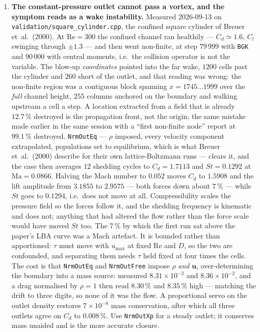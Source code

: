 \documentclass[11pt,a4paper]{article}
\newcommand{\code}[1]{\texttt{\small #1}}
\begin{document}
\begin{enumerate}[leftmargin=1.4em,itemsep=4pt]
\item \textbf{The constant-pressure outlet cannot pass a vortex, and the
  symptom reads as a wake instability.} Measured 2026-09-13 on
  \code{validation/square\_cylinder.cpp}, the confined square cylinder of
  Breuer et~al.\ (2000). At $\mathrm{Re}=300$ the confined channel
  ran healthily --- $C_d\simeq1.6$, $C_l$ swinging through $\pm1.3$ --- and then
  went non-finite, at step $79\,999$ with \code{BGK} and $90\,000$ with central
  moments, i.e.\ the collision operator is not the variable. The blow-up
  \emph{coordinates} pointed into the far wake, $1200$ cells past the cylinder
  and $260$ short of the outlet, and that reading was wrong: the non-finite
  region was a contiguous block spanning $x=1745\ldots1999$ over the \emph{full}
  channel height, $255$ columns anchored on the boundary and walking upstream a
  cell a step. A location extracted from a field that is already $12.7\,\%$
  destroyed is the propagation front, not the origin; the same mistake made
  earlier in the same session with a ``first non-finite node'' report at
  $99.1\,\%$ destroyed. \code{NrmOutEq} --- $\rho$ imposed, every velocity
  component extrapolated, populations set to equilibrium, which is what
  Breuer et~al.\ (2000) describe for their own lattice-Boltzmann runs --- clears
  it, and the case then averages $12$ shedding cycles to $C_d=1.7113$ and
  $St=0.1292$ at $\mathrm{Ma}=0.0866$. Halving the Mach number to $0.052$
  moves $C_d$ to $1.5908$ and the lift amplitude from $3.1855$ to $2.9575$ ---
  both forces down about $7\,\%$ --- while $St$ goes to $0.1294$, i.e.\ does
  not move at all. Compressibility scales the pressure field so the forces
  follow it, and the shedding frequency is kinematic and does not; anything
  that had altered the flow rather than the force scale would have moved $St$
  too. The $7\,\%$ by which the first run sat above the paper's LBA curve was
  a Mach artefact. It is bounded rather than apportioned: $\tau$ must move with
  $u_{\max}$ at fixed $\mathrm{Re}$ and $D$, so the two are confounded, and
  separating them needs $\tau$ held fixed at four times the cells. The cost is that \code{NrmOutEq} and \code{NrmOutFree} impose
  $\rho$ \emph{and} $\bm{u}$, over-determining the boundary into a mass source:
  measured $8.31\times10^{-2}$ and $8.36\times10^{-2}$, and a drag normalised by
  $\rho=1$ then read $8.30\,\%$ and $8.35\,\%$ high --- matching the drift to
  three digits, so none of it was the flow. A proportional servo on the outlet
  density restores $7\times10^{-8}$ mass conservation, after which all three
  outlets agree on $C_d$ to $0.008\,\%$. Use \code{NrmOutXp} for a steady
  outlet; it conserves mass unaided and is the more accurate closure.


\end{enumerate}
\end{document}
